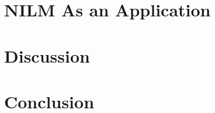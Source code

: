 \glsresetall 

\glsresetall
 

\glsresetall
 

\glsresetall


\glsresetall
\chapter{NILM As an Application} 

\glsresetall
\chapter{Discussion}

\glsresetall
\chapter{Conclusion}
\begingroup
	\raggedright
	
\endgroup

